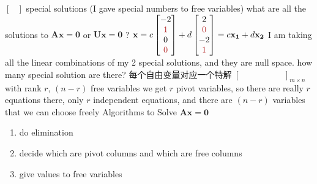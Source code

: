 \documentclass[12pt, a4paper]{article}
\begin{document}
{\begin{math}
\begin{bmatrix}
	\end{bmatrix}
\end{math}
 special solutions (I gave special numbers to free variables)
\newline
what are all the solutions to ${\mathbf{A}}{\mathbf{x}} = {\mathbf{0}}$ or ${\mathbf{U}}{\mathbf{x}} = {\mathbf{0}}$ ?
\newline
\begin{math}
	{\mathbf{x}} = 
	c
	\begin{bmatrix}
		-2 \\
		{\textcolor{anhao-scarlet}{1}} \\
		0 \\
		{\textcolor{anhao-scarlet}{0}}
	\end{bmatrix}
	 + 
	d
	\begin{bmatrix}
		2 \\
		{\textcolor{anhao-scarlet}{0}} \\
		-2 \\
		{\textcolor{anhao-scarlet}{1}}
	\end{bmatrix}
	 = 
	c{\mathbf{x_1}} + d{\mathbf{x_2}}
\end{math}
\newline
I am taking all the linear combinations of my 2 special solutions, and they are null space.
\vspace{14pt}
\newline
how many special solution are there? 每个自由变量对应一个特解
\vspace{14pt}
\newline
\begin{math}
	\begin{bmatrix}
		\ & \ & \ & \ & \ \\
		\ & \ & \ & \ & \ 
	\end{bmatrix}_{m \times n}
\end{math}
 with rank $r$, $(n-r)$ free variables
\newline
we get $r$ pivot variables, so there are really $r$ equations there, only $r$ independent equations, and there are $(n-r)$ variables that we can choose freely
\vspace{14pt}
\newline
Algorithms to Solve ${\mathbf{A}}{\mathbf{x}} = {\mathbf{0}}$
\begin{enumerate}
	\item do elimination
	\item decide which are pivot columns and which are free columns
	\item give values to free variables

\end{enumerate}}
\end{document}
